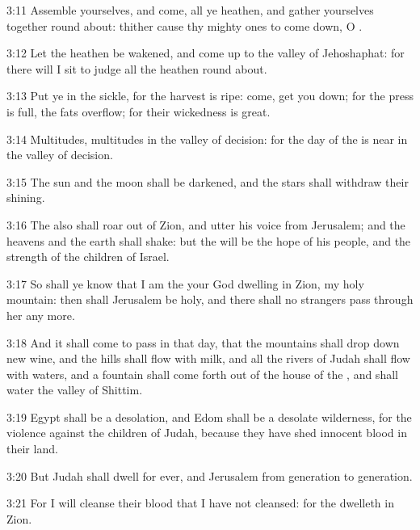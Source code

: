 3:11 Assemble yourselves, and come, all ye heathen, and gather yourselves together round about: thither cause thy mighty ones to come down, O \LORD.

3:12 Let the heathen be wakened, and come up to the valley of Jehoshaphat: for there will I sit to judge all the heathen round about.

3:13 Put ye in the sickle, for the harvest is ripe: come, get you down; for the press is full, the fats overflow; for their wickedness is great.

3:14 Multitudes, multitudes in the valley of decision: for the day of the \LORD is near in the valley of decision.

3:15 The sun and the moon shall be darkened, and the stars shall withdraw their shining.

3:16 The \LORD also shall roar out of Zion, and utter his voice from Jerusalem; and the heavens and the earth shall shake: but the \LORD will be the hope of his people, and the strength of the children of Israel.

3:17 So shall ye know that I am the \LORD your God dwelling in Zion, my holy mountain: then shall Jerusalem be holy, and there shall no strangers pass through her any more.

3:18 And it shall come to pass in that day, that the mountains shall drop down new wine, and the hills shall flow with milk, and all the rivers of Judah shall flow with waters, and a fountain shall come forth out of the house of the \LORD, and shall water the valley of Shittim.

3:19 Egypt shall be a desolation, and Edom shall be a desolate wilderness, for the violence against the children of Judah, because they have shed innocent blood in their land.

3:20 But Judah shall dwell for ever, and Jerusalem from generation to generation.

3:21 For I will cleanse their blood that I have not cleansed: for the \LORD dwelleth in Zion.

